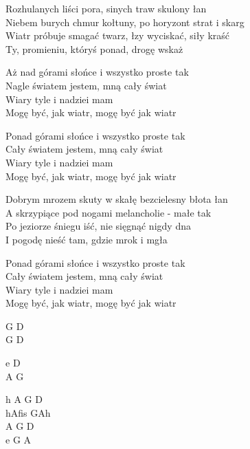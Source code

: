 \begin{text}
    Rozhulanych liści pora, sinych traw skulony łan\\
    Niebem burych chmur kołtuny,\chwyty{\\ \vin \vin \vin \vin \vin} po horyzont strat i skarg\\
    Wiatr próbuje smagać twarz, łzy wyciskać, siły kraść\\
    Ty, promieniu, któryś ponad, drogę wskaż

    Aż nad górami słońce i wszystko proste tak\\
    Nagle światem jestem, mną cały świat\\
    Wiary tyle i nadziei mam\\
    Mogę być, jak wiatr, mogę być jak wiatr

    Ponad górami słońce i wszystko proste tak\\
    Cały światem jestem, mną cały świat\\
    Wiary tyle i nadziei mam\\
    Mogę być, jak wiatr, mogę być jak wiatr

    Dobrym mrozem skuty w skałę bezcielesny błota łan\\
    A skrzypiące pod nogami melancholie - małe tak\\
    Po jeziorze śniegu iść, nie sięgnąć nigdy dna\\
    I pogodę nieść tam, gdzie mrok i mgła

    Ponad górami słońce i wszystko proste tak\\
    Cały światem jestem, mną cały świat\\
    Wiary tyle i nadziei mam\\
    Mogę być, jak wiatr, mogę być jak wiatr
\end{text}
\begin{chord}
    G D\\
    G D\ifOneCol \\ \else \par \fi
    e D\\
    A G

    h A G D\\
    hAfis GAh\\
    A G D\\
    e G A
\end{chord}